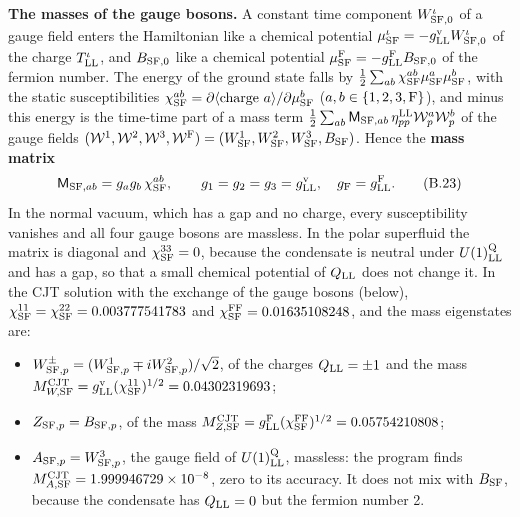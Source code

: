 \documentclass[
  10pt,
]{article}
\providecommand{\tightlist}{%
  \setlength{\itemsep}{0pt}\setlength{\parskip}{0pt}}
\begin{document}
\textbf{The masses of the gauge bosons.} A constant time component
\(W^\iota_{{\rm SF},0}\) of a gauge field enters the Hamiltonian like a
chemical potential
\(\mu^\iota_{\rm SF}=-g^{\rm v}_{\rm LL}W^\iota_{{\rm SF},0}\) of the
charge \(T^\iota_{\rm LL}\), and \(B_{{\rm SF},0}\) like a chemical
potential \(\mu^{\rm F}_{\rm SF}=-g^{\rm F}_{\rm LL}B_{{\rm SF},0}\) of
the fermion number. The energy of the ground state falls by
\(\tfrac12\sum_{ab}\chi^{ab}_{\rm SF}\mu^a_{\rm SF}\mu^b_{\rm SF}\),
with the static susceptibilities
\(\chi^{ab}_{\rm SF}=\partial\langle\text{charge }a\rangle/\partial\mu^b_{\rm SF}\)
(\(a,b\in\{1,2,3,{\rm F}\}\)), and minus this energy is the time-time
part of a mass term
\(\tfrac12\sum_{ab}\mathsf M_{{\rm SF},ab}\,\eta^{\rm LL}_{pp}\mathcal W^a_p\mathcal W^b_p\)
of the gauge fields
\((\mathcal W^1,\mathcal W^2,\mathcal W^3,\mathcal W^{\rm F})=(W^1_{\rm SF},W^2_{\rm SF},W^3_{\rm SF},B_{\rm SF})\).
Hence the \textbf{mass matrix}
\[\mathsf M_{{\rm SF},ab}=g_ag_b\,\chi^{ab}_{\rm SF},\qquad g_1=g_2=g_3=g^{\rm v}_{\rm LL},\quad g_{\rm F}=g^{\rm F}_{\rm LL}.\tag{B.23}\]
In the normal vacuum, which has a gap and no charge, every
susceptibility vanishes and all four gauge bosons are massless. In the
polar superfluid the matrix is diagonal and \(\chi^{33}_{\rm SF}=0\),
because the condensate is neutral under \(U(1)^{\rm Q}_{\rm LL}\) and
has a gap, so that a small chemical potential of \(Q_{\rm LL}\) does not
change it. In the CJT solution with the exchange of the gauge bosons
(below), \(\chi^{11}_{\rm SF}=\chi^{22}_{\rm SF}=0.003777541783\) and
\(\chi^{\rm FF}_{\rm SF}=0.01635108248\), and the mass eigenstates are:

\begin{itemize}
\tightlist
\item
  \(W^\pm_{{\rm SF},p}=(W^1_{{\rm SF},p}\mp iW^2_{{\rm SF},p})/\sqrt2\),
  of the charges \(Q_{\rm LL}=\pm1\) and the mass
  \(M^{\rm CJT}_{W,{\rm SF}}=g^{\rm v}_{\rm LL}(\chi^{11}_{\rm SF})^{1/2}=0.04302319693\);
\item
  \(Z_{{\rm SF},p}=B_{{\rm SF},p}\), of the mass
  \(M^{\rm CJT}_{Z,{\rm SF}}=g^{\rm F}_{\rm LL}(\chi^{\rm FF}_{\rm SF})^{1/2}=0.05754210808\);
\item
  \(A_{{\rm SF},p}=W^3_{{\rm SF},p}\), the gauge field of
  \(U(1)^{\rm Q}_{\rm LL}\), massless: the program finds
  \(M^{\rm CJT}_{A,{\rm SF}}=1.999946729\times10^{-8}\), zero to its
  accuracy. It does not mix with \(B_{\rm SF}\), because the condensate
  has \(Q_{\rm LL}=0\) but the fermion number 2.
\end{itemize}
\end{document}

